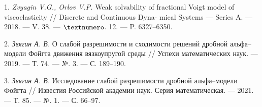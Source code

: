 \documentclass{vzmsthesis}
\begin{document}


1. {\it Zvyagin V.G., Orlov V.P.} Weak solvability of fractional Voigt model of viscoelasticity // Discrete and Continuous Dyna- mical Systems --- Series A. --- 2018. --- V. 38. --- $\No$. 12. --- P. 6327--6350.

2. {\it Звягин А. В.} О слабой разрешимости и сходимости решений дробной альфа--модели Фойгта движения вязкоупругой среды // Успехи математических наук. --- 2019. --- Т. 74. --- №. 3. --- С. 189--190.

3. {\it Звягин А. В.} Исследование слабой разрешимости дробной альфа--модели Фойгта // Известия Российской академии наук. Серия математическая. --- 2021. --- Т. 85. --- №. 1. --- С. 66--97.
\end{document}
